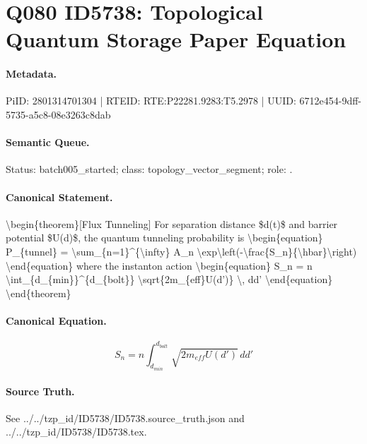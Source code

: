 \section*{Q080 ID5738: Topological Quantum Storage Paper Equation}
\paragraph{Metadata.}
PiID: 2801314701304 | RTEID: RTE:P22281.9283:T5.2978 | UUID: 6712e454-9dff-5735-a5c8-08e3263c8dab

\paragraph{Semantic Queue.}
Status: batch005\_started; class: topology\_vector\_segment; role: .

\paragraph{Canonical Statement.}
\textbackslash{}begin\{theorem\}[Flux Tunneling] For separation distance \$d(t)\$ and barrier potential \$U(d)\$, the quantum tunneling probability is \textbackslash{}begin\{equation\} P\_\{tunnel\} = \textbackslash{}sum\_\{n=1\}\textasciicircum{}\{\textbackslash{}infty\} A\_n \textbackslash{}exp\textbackslash{}left(-\textbackslash{}frac\{S\_n\}\{\textbackslash{}hbar\}\textbackslash{}right) \textbackslash{}end\{equation\} where the instanton action \textbackslash{}begin\{equation\} S\_n = n \textbackslash{}int\_\{d\_\{min\}\}\textasciicircum{}\{d\_\{bolt\}\} \textbackslash{}sqrt\{2m\_\{eff\}U(d')\} \textbackslash{}, dd' \textbackslash{}end\{equation\} \textbackslash{}end\{theorem\}

\paragraph{Canonical Equation.}
\[
\begin{equation} S_n = n \int_{d_{min}}^{d_{bolt}} \sqrt{2m_{eff}U(d')} \, dd' \end{equation}
\]

\paragraph{Source Truth.}
See ../../tzp\_id/ID5738/ID5738.source\_truth.json and ../../tzp\_id/ID5738/ID5738.tex.
